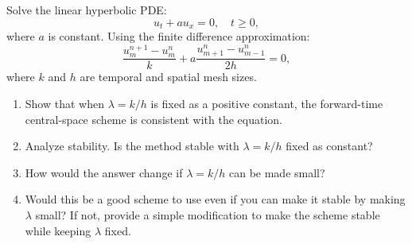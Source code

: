 \begin{exercise}
\label{applied:2015:3}
Solve the linear hyperbolic PDE:
\begin{equation}
u_{t}+au_{x}=0,\quad t\geq 0, \tag{1}
\end{equation}
where $a$ is constant. Using the finite difference approximation:
\begin{equation}
\frac{u_{m}^{n+1}-u_{m}^{n}}{k}+a\frac{u_{m+1}^{n}-u_{m-1}^{n}}{2h}=0, \tag{2}
\end{equation}
where $k$ and $h$ are temporal and spatial mesh sizes.

\begin{enumerate}
\item[(a)] Show that when $\lambda=k/h$ is fixed as a positive constant, the forward-time central-space scheme is consistent with the equation.
\item[(b)] Analyze stability. Is the method stable with $\lambda=k/h$ fixed as constant?
\item[(c)] How would the answer change if $\lambda=k/h$ can be made small?
\item[(d)] Would this be a good scheme to use even if you can make it stable by making $\lambda$ small? If not, provide a simple modification to make the scheme stable while keeping $\lambda$ fixed.
\end{enumerate}
\end{exercise}

